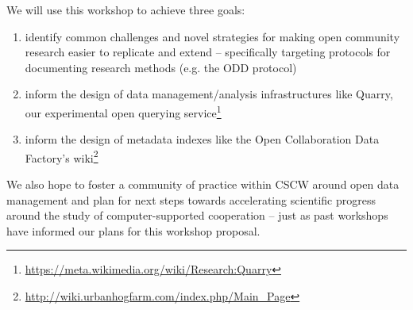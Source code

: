 We will use this workshop to achieve three goals:
\begin{enumerate}
\item identify common challenges and novel strategies for making open community research easier to replicate and extend -- specifically targeting protocols for documenting research methods (e.g. the ODD protocol\cite{grimm10odd})
\item inform the design of data management/analysis infrastructures like Quarry, our experimental open querying service\footnote{\url{https://meta.wikimedia.org/wiki/Research:Quarry}}
\item inform the design of metadata indexes like the Open Collaboration Data Factory's wiki\footnote{\url{http://wiki.urbanhogfarm.com/index.php/Main_Page}}
\end{enumerate}

We also hope to foster a community of practice within CSCW around open data management and plan for next steps towards accelerating scientific progress around the study of computer-supported cooperation -- just as past workshops have informed our plans for this workshop proposal.
